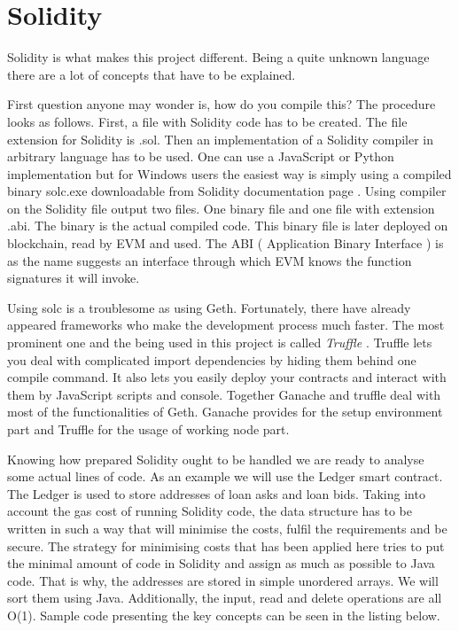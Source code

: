 \documentclass[a4paper,12pt,twoside,openany]{report}
\begin{document}
\section{Solidity} \label{solidity}

Solidity is what makes this project different. Being a quite unknown language there are a lot of concepts that have to be explained.

First question anyone may wonder is, how do you compile this? The procedure looks as follows. First, a file with Solidity code has to be created. The file extension for Solidity is .sol. Then an implementation  of a Solidity compiler in arbitrary language has to be used. One can use a JavaScript or Python implementation but for Windows users the easiest way is simply using a compiled binary solc.exe downloadable from Solidity documentation page \cite{solc}. Using compiler on the Solidity file output two files. One binary file and one file with extension .abi. The binary is the actual compiled code. This binary file is later deployed on blockchain, read by EVM and used. The ABI ( Application Binary Interface ) is as the name suggests an interface through which EVM knows the function signatures it will invoke. 

Using solc is a troublesome as using Geth. Fortunately, there have already appeared frameworks who make the development process much faster. The most prominent one and the being used in this project is called \textit{Truffle} \cite{truffle}. Truffle lets you deal with complicated import dependencies by hiding them behind one compile command. It also lets you easily deploy your contracts and interact with them by JavaScript scripts and console. Together Ganache and truffle deal with most of the functionalities of Geth. Ganache provides for the setup environment part and Truffle for the usage of working node part.

Knowing how prepared Solidity ought to be handled we are ready to analyse some actual lines of code.
As an example we will use the Ledger smart contract. The Ledger is used to store addresses of loan asks and loan bids. Taking into account the gas cost of running Solidity code, the data structure has to be written in such a way that will minimise the costs, fulfil the requirements and be secure. The strategy for minimising costs that has been applied here tries to put the minimal amount of code in Solidity and assign as much as possible to Java code. That is why, the addresses are stored in simple unordered arrays. We will sort them using Java. Additionally, the input, read and delete operations are all O(1). Sample code presenting the key concepts can be seen in the listing below.
\end{document}
